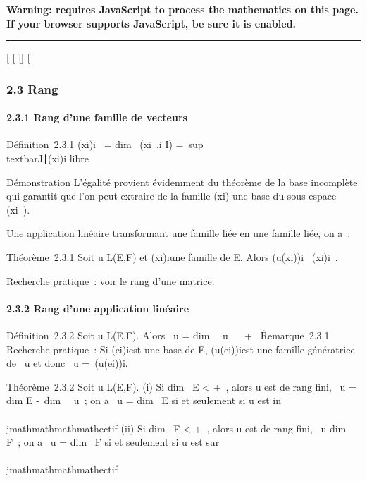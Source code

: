 \textbf{Warning: 
requires JavaScript to process the mathematics on this page.\\ If your
browser supports JavaScript, be sure it is enabled.}

\begin{center}\rule{3in}{0.4pt}\end{center}

{[}
{[}
{[}{]}
{[}

\subsubsection{2.3 Rang}

\paragraph{2.3.1 Rang d'une famille de vecteurs}

Définition~2.3.1
\mathrmrg(xi)i\inI~
= dim~
\mathrmVect(xi~,i
\in I) =\
sup\\textbar{}J\textbar{}∣(xi)i\inJ\text
libre \

Démonstration L'égalité provient évidemment du théorème de la base
incomplète qui garantit que l'on peut extraire de la famille
(xi) une base du sous-espace
\mathrmVect(xi~).

Une application linéaire transformant une famille liée en une famille
liée, on a~:

Théorème~2.3.1 Soit u \in L(E,F) et (xi)i\inI une
famille de E. Alors
\mathrmrg(u(xi))i\inI~
\leq\mathrmrg(xi)i\inI~.

Recherche pratique~: voir le rang d'une matrice.

\paragraph{2.3.2 Rang d'une application linéaire}

Définition~2.3.2 Soit u \in L(E,F). Alors
\mathrmrg~u
= dim~
\mathrmIm~u \in {}~
\cup\ + \infty~\.

Remarque~2.3.1 Recherche pratique~: Si (ei)i\inI est
une base de E, (u(ei))i\inI est une famille
génératrice de \mathrmIm~u
et donc \mathrmrg~u
=\
\mathrmrg(u(ei))i\inI.

Théorème~2.3.2 Soit u \in L(E,F). (i) Si dim~ E
\textless{} +\infty~, alors u est de rang fini,
\mathrmrg~u
= dim E -\ dim~
\mathrmKer~u~; on a
\mathrmrg~u
= dim~ E si et seulement si u est in\\\\jmathmathmathmathectif (ii)
Si dim~ F \textless{} +\infty~, alors u est de rang
fini, \mathrmrg~u
\leq dim~ F~; on a
\mathrmrg~u
= dim~ F si et seulement si u est sur\\\\jmathmathmathmathectif

